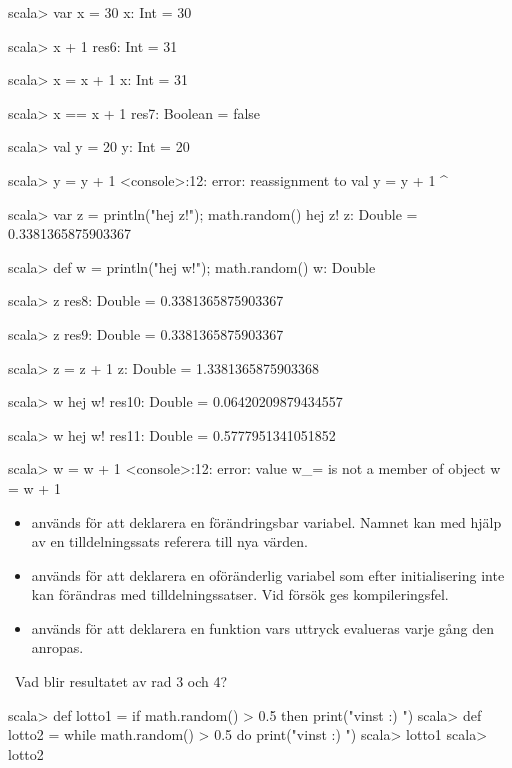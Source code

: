 \SubtaskSolved
\begin{REPL}
  scala> var x = 30
  x: Int = 30

  scala> x + 1
  res6: Int = 31

  scala> x = x + 1
  x: Int = 31

  scala> x == x + 1
  res7: Boolean = false

  scala> val y = 20
  y: Int = 20

  scala> y = y + 1
  <console>:12: error: reassignment to val
         y = y + 1
           ^

  scala> var z = { println("hej z!"); math.random() }
  hej z!
  z: Double = 0.3381365875903367

  scala> def w = { println("hej w!"); math.random() }
  w: Double

  scala> z
  res8: Double = 0.3381365875903367

  scala> z
  res9: Double = 0.3381365875903367

  scala> z = z + 1
  z: Double = 1.3381365875903368

  scala> w
  hej w!
  res10: Double = 0.06420209879434557

  scala> w
  hej w!
  res11: Double = 0.5777951341051852

  scala> w = w + 1
  <console>:12: error: value w_= is not a member of object
         w = w + 1
\end{REPL}


\SubtaskSolved
\begin{itemize}
\item {} används för att deklarera en förändringsbar variabel. Namnet kan med hjälp av en tilldelningssats referera till nya värden.

\item {} används för att deklarera en oföränderlig variabel som efter initialisering inte kan förändras med tilldelningssatser. Vid försök ges kompileringsfel.
\item {} används för att deklarera en funktion vars uttryck evalueras varje gång den anropas.
\end{itemize}

\QUESTEND





\QUESTBEGIN

\Task \what~Vad blir resultatet av rad 3 och 4?

\begin{REPL}
scala> def lotto1 = if math.random() > 0.5 then print("vinst :) ")
scala> def lotto2 = while math.random() > 0.5 do print("vinst :) ")
scala> lotto1
scala> lotto2
\end{REPL}

